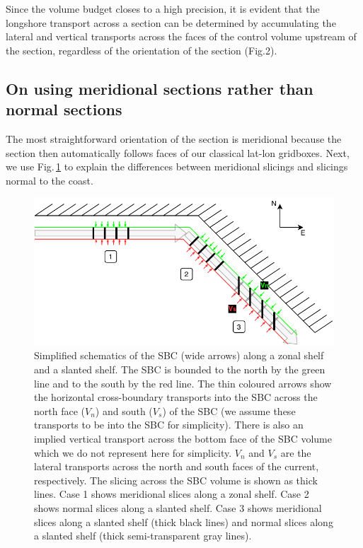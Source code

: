 \documentclass[preprint,3p,review,12pt]{elsarticle}
\begin{document}
Since the volume budget closes to a high precision, it is evident that the longshore transport across a section can be determined by accumulating the lateral and vertical transports across the faces of the control volume upstream of the section, regardless of the orientation of the section (Fig.2).

\subsection{On using meridional sections rather than normal sections}
The most straightforward orientation of the section is meridional because the section then automatically follows faces of our classical lat-lon gridboxes. Next, we use Fig.\,\ref{slices} to explain the differences between meridional slicings and slicings normal to the coast.

\begin{figure}[hbp]
    \includegraphics[width=1\textwidth, height=1\textheight, keepaspectratio]{slices.pdf}
    \caption{\label{slices}%
    Simplified schematics of the SBC (wide arrows) along a zonal shelf and a slanted shelf. The SBC is bounded to the north by the green line and to the south by the red line. The thin coloured arrows show the horizontal cross-boundary transports into the SBC across the north face ($V_n$) and south ($V_s$) of the SBC (we assume these transports to be into the SBC for simplicity). There is also an implied vertical transport across the bottom face of the SBC volume which we do not represent here for simplicity. $V_n$ and $V_s$ are the lateral transports across the north and south faces of the current, respectively. The slicing across the SBC volume is shown as thick lines. Case 1 shows meridional slices along a zonal shelf. Case 2 shows normal slices along a slanted shelf. Case 3 shows meridional slices along a slanted shelf (thick black lines) and normal slices along a slanted shelf (thick semi-transparent gray lines).}
\end{figure}
\end{document}
